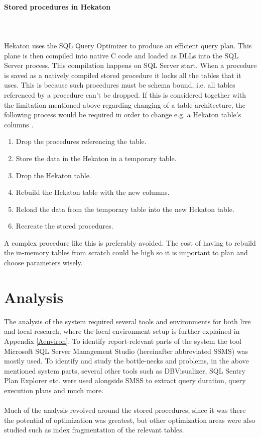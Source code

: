 \documentclass{cslthse-msc}
\begin{document}
\paragraph*{Stored procedures in Hekaton}\mbox{}\\\\ 
Hekaton uses the SQL Query Optimizer to produce an efficient query plan. This plane is then compiled into native C code and loaded as DLLs into the SQL Server process. This compilation happens on SQL Server start.
When a procedure is saved as a natively compiled stored procedure it locks all the tables that it uses. This is because such procedures must be schema bound, i.e. all tables referenced by a procedure can't be dropped. If this is considered together with the limitation mentioned above regarding changing of a table architecture, the following process would be required in order to change e.g. a Hekaton table's columns   \cite{Nevarez}.
\begin{enumerate}
\item Drop the procedures referencing the table.
\item Store the data in the Hekaton in a temporary table.
\item Drop the Hekaton table.
\item Rebuild the Hekaton table with the new columns.
\item Reload the data from the temporary table into the new Hekaton table. 
\item Recreate the stored procedures.
\end{enumerate}

A complex procedure like this is preferably avoided. The cost of having to rebuild the in-memory tables from scratch could be high so it is important to plan and choose parameters wisely.


\section{Analysis}\label{sec:analysis}
The analysis of the system required several tools and environments for both live and local research, where the local environment setup is further explained in Appendix \ref{Aenviron}. To identify report-relevant parts of the system the tool Microsoft SQL Server Management Studio (hereinafter abbreviated SSMS) was mostly used. To identify and study the bottle-necks and problems, in the above mentioned system parts, several other tools such as DBVisualizer, SQL Sentry Plan Explorer etc. were used alongside SMSS to extract query duration, query execution plans and much more.\\\\
Much of the analysis revolved around the stored procedures, since it was there the potential of optimization was greatest, but other optimization areas were also studied such as index fragmentation of the relevant tables.      
\end{document}
